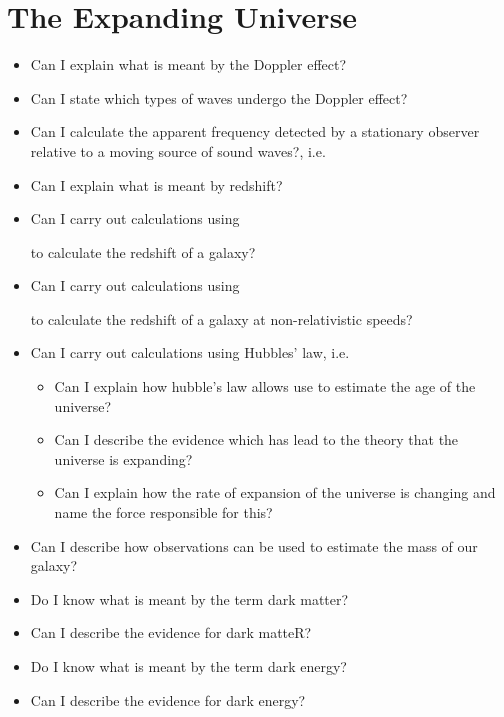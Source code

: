 \section{The Expanding Universe}
\begin{multicols}{2}
	\begin{itemize}
        \item Can I explain what is meant by the Doppler effect?

        \item Can I state which types of waves undergo the Doppler
            effect?

        \item Can I calculate the apparent frequency detected by a
            stationary observer relative to a moving source of sound
            waves?, i.e.
        \item Can I explain what is meant by redshift?
        \item Can I carry out calculations using

            to calculate the redshift of a galaxy?
        \item Can I carry out calculations using

            to calculate the redshift of a galaxy at non-relativistic speeds?

        \item Can I carry out calculations using Hubbles' law, i.e.
            \begin{itemize}
                \item Can I explain how hubble's law allows use to estimate the
                    age of the universe?
                \item Can I describe the evidence which has lead to the theory
                    that the universe is expanding?
                \item Can I explain how the rate of expansion of the universe
                    is changing and name the force responsible for this?
            \end{itemize}

        \item Can I describe how observations can be used to estimate the mass
            of our galaxy?

        \item Do I know what is meant by the term dark matter?

        \item Can I describe the evidence for dark matteR?

        \item Do I know what is meant by the term dark energy?

        \item Can I describe the evidence for dark energy?
	\end{itemize}
\end{multicols}

